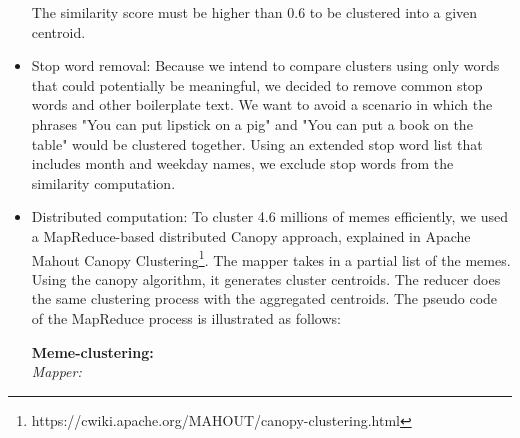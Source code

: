 \documentclass{sig-alternate}
\begin{document}
\begin{itemize}
The similarity score must be higher than 0.6 to be clustered into a given centroid.
 
 \item Stop word removal: Because we intend to compare clusters using only words that could potentially be meaningful, we decided to remove common stop words and other boilerplate text. We want to avoid a scenario in which the phrases "You can put lipstick on a pig" and "You can put a book on the table" would be clustered together. Using an extended stop word list that includes month and weekday names, we exclude stop words from the similarity computation. 
 \item Distributed computation: To cluster 4.6 millions of memes efficiently, we used a MapReduce-based distributed Canopy approach, explained in Apache Mahout Canopy Clustering\footnote{https://cwiki.apache.org/MAHOUT/canopy-clustering.html}. The mapper takes in a partial list of the memes. Using the canopy algorithm, it generates cluster centroids. The reducer does the same clustering process with the aggregated centroids. The pseudo code of the MapReduce process is illustrated as follows:
 

\begin{centering}
\begin{tabbing}
\textbf{Meme-clustering:}\\
\emph{Mapper:}\\


\end{tabbing}
\end{centering}
\end{itemize}
\end{document}
